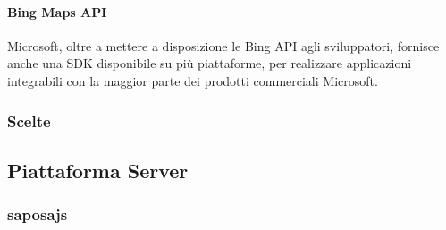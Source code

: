 \paragraph{Bing Maps API}
Microsoft, oltre a mettere a disposizione le Bing API agli sviluppatori, fornisce anche una SDK disponibile su più piattaforme, per realizzare applicazioni integrabili con la maggior parte dei prodotti commerciali Microsoft.
\subsubsection{Scelte}

\subsection{Piattaforma Server}
\subsubsection{saposajs}

